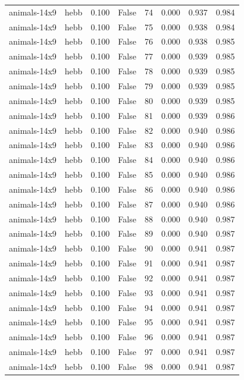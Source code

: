 \begin{tabular}{llrrrrrr}
animals-14x9 & hebb & 0.100 & False & 74 & 0.000 & 0.937 & 0.984 \\
animals-14x9 & hebb & 0.100 & False & 75 & 0.000 & 0.938 & 0.984 \\
animals-14x9 & hebb & 0.100 & False & 76 & 0.000 & 0.938 & 0.985 \\
animals-14x9 & hebb & 0.100 & False & 77 & 0.000 & 0.939 & 0.985 \\
animals-14x9 & hebb & 0.100 & False & 78 & 0.000 & 0.939 & 0.985 \\
animals-14x9 & hebb & 0.100 & False & 79 & 0.000 & 0.939 & 0.985 \\
animals-14x9 & hebb & 0.100 & False & 80 & 0.000 & 0.939 & 0.985 \\
animals-14x9 & hebb & 0.100 & False & 81 & 0.000 & 0.939 & 0.986 \\
animals-14x9 & hebb & 0.100 & False & 82 & 0.000 & 0.940 & 0.986 \\
animals-14x9 & hebb & 0.100 & False & 83 & 0.000 & 0.940 & 0.986 \\
animals-14x9 & hebb & 0.100 & False & 84 & 0.000 & 0.940 & 0.986 \\
animals-14x9 & hebb & 0.100 & False & 85 & 0.000 & 0.940 & 0.986 \\
animals-14x9 & hebb & 0.100 & False & 86 & 0.000 & 0.940 & 0.986 \\
animals-14x9 & hebb & 0.100 & False & 87 & 0.000 & 0.940 & 0.986 \\
animals-14x9 & hebb & 0.100 & False & 88 & 0.000 & 0.940 & 0.987 \\
animals-14x9 & hebb & 0.100 & False & 89 & 0.000 & 0.940 & 0.987 \\
animals-14x9 & hebb & 0.100 & False & 90 & 0.000 & 0.941 & 0.987 \\
animals-14x9 & hebb & 0.100 & False & 91 & 0.000 & 0.941 & 0.987 \\
animals-14x9 & hebb & 0.100 & False & 92 & 0.000 & 0.941 & 0.987 \\
animals-14x9 & hebb & 0.100 & False & 93 & 0.000 & 0.941 & 0.987 \\
animals-14x9 & hebb & 0.100 & False & 94 & 0.000 & 0.941 & 0.987 \\
animals-14x9 & hebb & 0.100 & False & 95 & 0.000 & 0.941 & 0.987 \\
animals-14x9 & hebb & 0.100 & False & 96 & 0.000 & 0.941 & 0.987 \\
animals-14x9 & hebb & 0.100 & False & 97 & 0.000 & 0.941 & 0.987 \\
animals-14x9 & hebb & 0.100 & False & 98 & 0.000 & 0.941 & 0.987 \\

\end{tabular}

